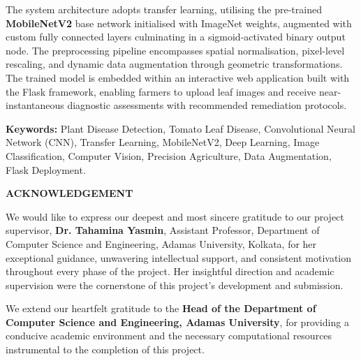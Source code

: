\documentclass[12pt,a4paper]{report}
\begin{document}
\vspace{10pt}

\noindent The system architecture adopts transfer learning, utilising the pre-trained \textbf{MobileNetV2} base network initialised with ImageNet weights, augmented with custom fully connected layers culminating in a sigmoid-activated binary output node. The preprocessing pipeline encompasses spatial normalisation, pixel-level rescaling, and dynamic data augmentation through geometric transformations. The trained model is embedded within an interactive web application built with the Flask framework, enabling farmers to upload leaf images and receive near-instantaneous diagnostic assessments with recommended remediation protocols.

\vspace{20pt}

\noindent\textbf{Keywords:} Plant Disease Detection, Tomato Leaf Disease, Convolutional Neural Network (CNN), Transfer Learning, MobileNetV2, Deep Learning, Image Classification, Computer Vision, Precision Agriculture, Data Augmentation, Flask Deployment.

\clearpage
\thispagestyle{plain}
\begin{center}
  {\Large\textbf{ACKNOWLEDGEMENT}}
\end{center}
\vspace{16pt}

\noindent We would like to express our deepest and most sincere gratitude to our project supervisor, \textbf{Dr. Tahamina Yasmin}, Assistant Professor, Department of Computer Science and Engineering, Adamas University, Kolkata, for her exceptional guidance, unwavering intellectual support, and consistent motivation throughout every phase of the project. Her insightful direction and academic supervision were the cornerstone of this project's development and submission.

\vspace{10pt}

\noindent We extend our heartfelt gratitude to the \textbf{Head of the Department of Computer Science and Engineering, Adamas University}, for providing a conducive academic environment and the necessary computational resources instrumental to the completion of this project.

\vspace{10pt}
\end{document}
